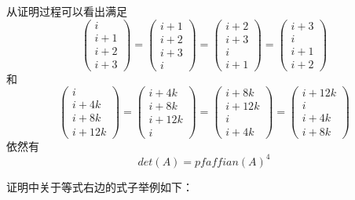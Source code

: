 \documentclass[twoside,a4paper,CCT]{cctart}   %
\begin{document}
从证明过程可以看出满足$$\begin{pmatrix}i\\i+1\\i+2\\i+3 \end{pmatrix}=\begin{pmatrix}i+1\\i+2\\i+3\\i \end{pmatrix}=\begin{pmatrix}i+2\\i+3\\i\\i+1 \end{pmatrix}=\begin{pmatrix}i+3\\i\\i+1\\i+2 \end{pmatrix}$$和$$\begin{pmatrix}i\\i+4k\\i+8k\\i+12k \end{pmatrix}=\begin{pmatrix}i+4k\\i+8k\\i+12k\\i \end{pmatrix}=\begin{pmatrix}i+8k\\i+12k\\i\\i+4k \end{pmatrix}=\begin{pmatrix}i+12k\\i\\i+4k\\i+8k \end{pmatrix}$$
依然有$$det(A)=pfaffian(A)^{4}$$

证明中关于等式右边的式子举例如下：
\end{document}
